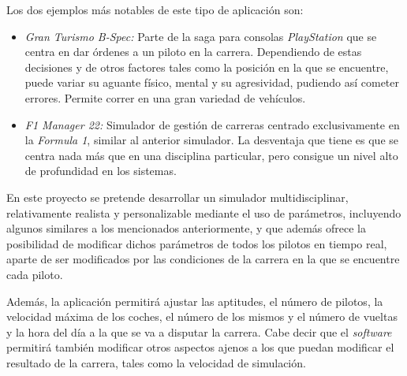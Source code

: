 \documentclass[a4paper,11pt]{book}
\begin{document}
\bigskip

Los dos ejemplos más notables de este tipo de aplicación son:

\begin{itemize}
   \item \textit{Gran Turismo B-Spec: }Parte de la saga para consolas \textit{PlayStation} que se centra en dar órdenes a un piloto en la carrera. Dependiendo de estas decisiones y de otros factores tales como la posición en la que se encuentre, puede variar su aguante físico, mental y su agresividad, pudiendo así cometer errores. Permite correr en una gran variedad de vehículos.
   \item \textit{F1 Manager 22: }Simulador de gestión de carreras centrado exclusivamente en la \textit{Formula 1}, similar al anterior simulador. La desventaja que tiene es que se centra nada más que en una disciplina particular, pero consigue un nivel alto de profundidad en los sistemas.
\end{itemize}

En este proyecto se pretende desarrollar un simulador multidisciplinar, relativamente realista y personalizable mediante el uso de parámetros, incluyendo algunos similares a los mencionados anteriormente, y que además ofrece la posibilidad de modificar dichos parámetros de todos los pilotos en tiempo real, aparte de ser modificados por las condiciones de la carrera en la que se encuentre cada piloto.

\bigskip

Además, la aplicación permitirá ajustar las aptitudes, el número de pilotos, la velocidad máxima de los coches, el número de los mismos y el número de vueltas y la hora del día a la que se va a disputar la carrera. Cabe decir que el \textit{software} permitirá también modificar otros aspectos ajenos a los que puedan modificar el resultado de la carrera, tales como la velocidad de simulación.
\end{document}
